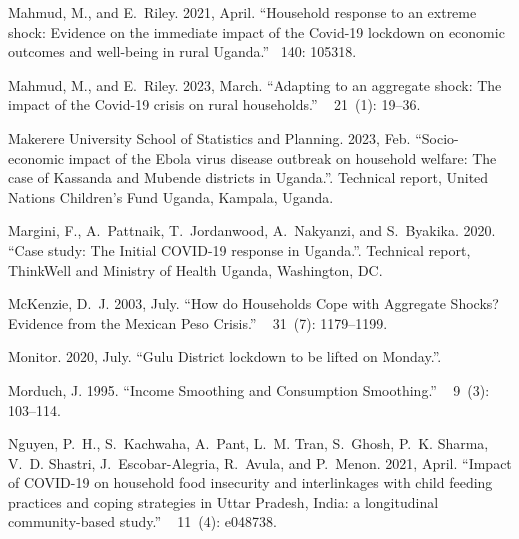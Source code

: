 \documentclass{wber}
\begin{document}
\begin{thebibliography}{}
Mahmud, M., and E.~Riley. 2021, April.
\newblock ``Household response to an extreme shock: {Evidence} on the immediate
  impact of the {Covid}-19 lockdown on economic outcomes and well-being in
  rural {Uganda}.''
~{140}: 105318.

Mahmud, M., and E.~Riley. 2023, March.
\newblock ``Adapting to an aggregate shock: {The} impact of the {Covid}-19
  crisis on rural households.''
~{ 21\/}~(1): 19--36.

{Makerere University School of Statistics and Planning}. 2023, Feb.
\newblock ``Socio-economic impact of the {Ebola} virus disease outbreak on
  household welfare: The case of {Kassanda} and {Mubende} districts in
  {Uganda}.''.
\newblock Technical report, United Nations Children's Fund Uganda, Kampala,
  Uganda.

Margini, F., A.~Pattnaik, T.~Jordanwood, A.~Nakyanzi, and S.~Byakika. 2020.
\newblock ``Case study: {The} {Initial} {COVID}-19 response in {Uganda}.''.
\newblock Technical report, ThinkWell and Ministry of Health Uganda,
  Washington, DC.

McKenzie, D.~J. 2003, July.
\newblock ``How do {Households} {Cope} with {Aggregate} {Shocks}? {Evidence}
  from the {Mexican} {Peso} {Crisis}.''
~{ 31\/}~(7):
  1179--1199.

Monitor. 2020, July.
\newblock ``Gulu {District} lockdown to be lifted on {Monday}.''.

Morduch, J. 1995.
\newblock ``Income {Smoothing} and {Consumption} {Smoothing}.''
~{ 9\/}~(3): 103--114.

Nguyen, P.~H., S.~Kachwaha, A.~Pant, L.~M. Tran, S.~Ghosh, P.~K. Sharma, V.~D.
  Shastri, J.~Escobar-Alegria, R.~Avula, and P.~Menon. 2021, April.
\newblock ``Impact of {COVID}-19 on household food insecurity and interlinkages
  with child feeding practices and coping strategies in {Uttar} {Pradesh},
  {India}: a longitudinal community-based study.''
~{ 11\/}~(4): e048738.


\end{thebibliography}
\end{document}
